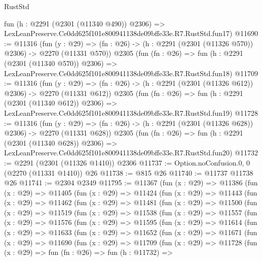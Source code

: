 \begin{lexlean}{RustStd}
\begin{coremodule}
    fun (h : @2291 (@2301 (@11340 @490)) @2306) =>
    LexLeanPreserve.Ce0dd625f101e800941138de09bffe33e.R7.RustStd.fun17)
@11690 := @11316
    (fun (y : @29) => (fn : @26) -> (h : @2291 (@2301 (@11326 @570)) @2306) -> @2270 (@11331 @570))
    @2305
    (fun (fn : @26) =>
    fun (h : @2291 (@2301 (@11340 @570)) @2306) =>
    LexLeanPreserve.Ce0dd625f101e800941138de09bffe33e.R7.RustStd.fun18)
@11709 := @11316
    (fun (y : @29) => (fn : @26) -> (h : @2291 (@2301 (@11326 @612)) @2306) -> @2270 (@11331 @612))
    @2305
    (fun (fn : @26) =>
    fun (h : @2291 (@2301 (@11340 @612)) @2306) =>
    LexLeanPreserve.Ce0dd625f101e800941138de09bffe33e.R7.RustStd.fun19)
@11728 := @11316
    (fun (y : @29) => (fn : @26) -> (h : @2291 (@2301 (@11326 @628)) @2306) -> @2270 (@11331 @628))
    @2305
    (fun (fn : @26) =>
    fun (h : @2291 (@2301 (@11340 @628)) @2306) =>
    LexLeanPreserve.Ce0dd625f101e800941138de09bffe33e.R7.RustStd.fun20)
@11732 := @2291 (@2301 (@11326 @1410)) @2306
@11737 := Option.noConfusion.{0, 0} (@2270 (@11331 @1410)) @26
@11738 := @815 @26
@11740 := @11737 @11738 @26
@11741 := @2304 @2349
@11795 := @11367
    (fun (x : @29) =>
    @11386
      (fun (x : @29) =>
      @11405
        (fun (x : @29) =>
        @11424
          (fun (x : @29) =>
          @11443
            (fun (x : @29) =>
            @11462
              (fun (x : @29) =>
              @11481
                (fun (x : @29) =>
                @11500
                  (fun (x : @29) =>
                  @11519
                    (fun (x : @29) =>
                    @11538
                      (fun (x : @29) =>
                      @11557
                        (fun (x : @29) =>
                        @11576
                          (fun (x : @29) =>
                          @11595
                            (fun (x : @29) =>
                            @11614
                              (fun (x : @29) =>
                              @11633
                                (fun (x : @29) =>
                                @11652
                                  (fun (x : @29) =>
                                  @11671
                                    (fun (x : @29) =>
                                    @11690
                                      (fun (x : @29) =>
                                      @11709
                                        (fun (x : @29) =>
                                        @11728
                                          (fun (x : @29) =>
                                          fun (fn : @26) =>
                                          fun (h : @11732) =>

\end{coremodule}
\end{lexlean}
